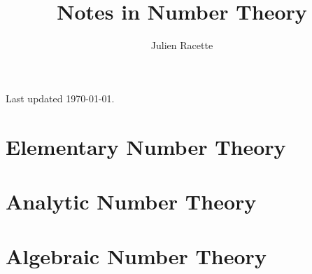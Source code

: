 

\title{Notes in Number Theory}
\author{Julien Racette}


\maketitle

Last updated \today.



\part{Elementary Number Theory}


\part{Analytic Number Theory}


\part{Algebraic Number Theory}







